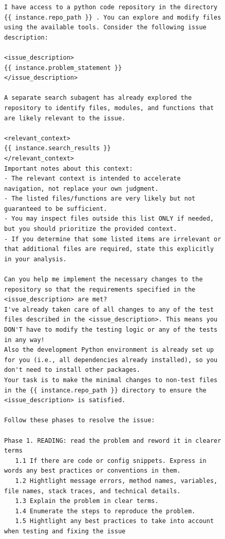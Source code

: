 \begin{figure}[!h]
    \centering
\begin{tcolorbox}[colback=blue!6!white, colframe=blue!45!white, title={\small User Prompt for OpenHands Issue Resolution Agent Augmented with Locations Retrieved by \methodname-14B (continued)}]
\begin{lstlisting}[basicstyle=\fontsize{6.5}{8}\ttfamily]
I have access to a python code repository in the directory {{ instance.repo_path }} . You can explore and modify files using the available tools. Consider the following issue description:

<issue_description>
{{ instance.problem_statement }}
</issue_description>

A separate search subagent has already explored the repository to identify files, modules, and functions that are likely relevant to the issue.

<relevant_context>
{{ instance.search_results }}
</relevant_context>
Important notes about this context:
- The relevant context is intended to accelerate navigation, not replace your own judgment.
- The listed files/functions are very likely but not guaranteed to be sufficient.
- You may inspect files outside this list ONLY if needed, but you should prioritize the provided context.
- If you determine that some listed items are irrelevant or that additional files are required, state this explicitly in your analysis.

Can you help me implement the necessary changes to the repository so that the requirements specified in the <issue_description> are met?
I've already taken care of all changes to any of the test files described in the <issue_description>. This means you DON'T have to modify the testing logic or any of the tests in any way!
Also the development Python environment is already set up for you (i.e., all dependencies already installed), so you don't need to install other packages.
Your task is to make the minimal changes to non-test files in the {{ instance.repo_path }} directory to ensure the <issue_description> is satisfied.

Follow these phases to resolve the issue:

Phase 1. READING: read the problem and reword it in clearer terms
   1.1 If there are code or config snippets. Express in words any best practices or conventions in them.
   1.2 Hightlight message errors, method names, variables, file names, stack traces, and technical details.
   1.3 Explain the problem in clear terms.
   1.4 Enumerate the steps to reproduce the problem.
   1.5 Hightlight any best practices to take into account when testing and fixing the issue


\end{lstlisting}
\end{tcolorbox}
\end{figure}
